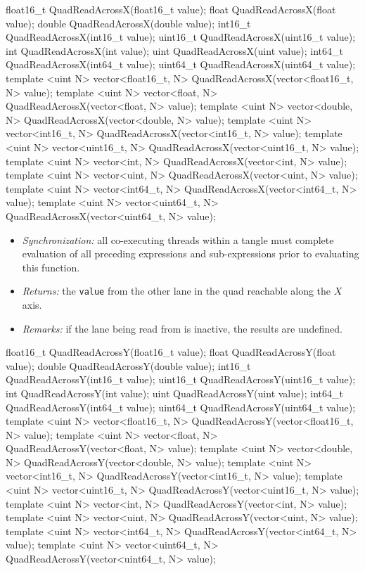 \begin{HLSL}
float16_t QuadReadAcrossX(float16_t value);
float QuadReadAcrossX(float value);
double QuadReadAcrossX(double value);
int16_t QuadReadAcrossX(int16_t value);
uint16_t QuadReadAcrossX(uint16_t value);
int QuadReadAcrossX(int value);
uint QuadReadAcrossX(uint value);
int64_t QuadReadAcrossX(int64_t value);
uint64_t QuadReadAcrossX(uint64_t value);
template <uint N> vector<float16_t, N> QuadReadAcrossX(vector<float16_t, N> value);
template <uint N> vector<float, N> QuadReadAcrossX(vector<float, N> value);
template <uint N> vector<double, N> QuadReadAcrossX(vector<double, N> value);
template <uint N> vector<int16_t, N> QuadReadAcrossX(vector<int16_t, N> value);
template <uint N> vector<uint16_t, N> QuadReadAcrossX(vector<uint16_t, N> value);
template <uint N> vector<int, N> QuadReadAcrossX(vector<int, N> value);
template <uint N> vector<uint, N> QuadReadAcrossX(vector<uint, N> value);
template <uint N> vector<int64_t, N> QuadReadAcrossX(vector<int64_t, N> value);
template <uint N> vector<uint64_t, N> QuadReadAcrossX(vector<uint64_t, N> value);
\end{HLSL}

\begin{itemize}
  \item \textit{Synchronization:} all co-executing threads within a \gls{tangle}
  must complete evaluation of all preceding expressions and sub-expressions
  prior to evaluating this function.
  \item \textit{Returns:} the \texttt{value} from the other \gls{lane} in the
  \gls{quad} reachable along the $X$ axis.
  \item \textit{Remarks:} if the \gls{lane} being read from is inactive, the
  results are undefined.
\end{itemize}

\begin{HLSL}
float16_t QuadReadAcrossY(float16_t value);
float QuadReadAcrossY(float value);
double QuadReadAcrossY(double value);
int16_t QuadReadAcrossY(int16_t value);
uint16_t QuadReadAcrossY(uint16_t value);
int QuadReadAcrossY(int value);
uint QuadReadAcrossY(uint value);
int64_t QuadReadAcrossY(int64_t value);
uint64_t QuadReadAcrossY(uint64_t value);
template <uint N> vector<float16_t, N> QuadReadAcrossY(vector<float16_t, N> value);
template <uint N> vector<float, N> QuadReadAcrossY(vector<float, N> value);
template <uint N> vector<double, N> QuadReadAcrossY(vector<double, N> value);
template <uint N> vector<int16_t, N> QuadReadAcrossY(vector<int16_t, N> value);
template <uint N> vector<uint16_t, N> QuadReadAcrossY(vector<uint16_t, N> value);
template <uint N> vector<int, N> QuadReadAcrossY(vector<int, N> value);
template <uint N> vector<uint, N> QuadReadAcrossY(vector<uint, N> value);
template <uint N> vector<int64_t, N> QuadReadAcrossY(vector<int64_t, N> value);
template <uint N> vector<uint64_t, N> QuadReadAcrossY(vector<uint64_t, N> value);
\end{HLSL}

